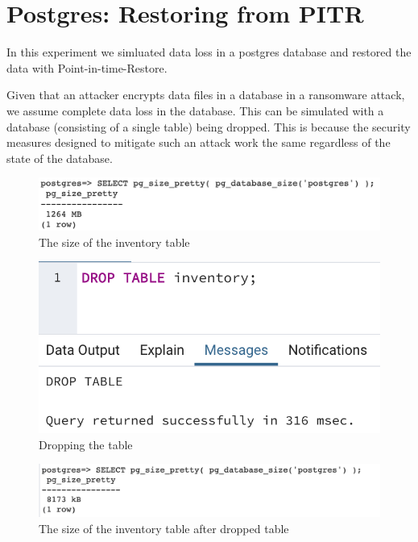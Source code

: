 \section{Postgres: Restoring from PITR}
\label{app_pg_s1e1}

In this experiment we simluated data loss in a postgres database and restored the data with Point-in-time-Restore. 

Given that an attacker encrypts data files in a database in a ransomware attack, we assume complete data loss in the database. This can be simulated with a database (consisting of a single table) being dropped. This is because the security measures designed to mitigate such an attack work the same regardless of the state of the database.

\begin{figure}[h]
    \centering
    \includegraphics[width=\textwidth]{figures/postgres/postgres-1GB.png}
    \caption{The size of the inventory table}
    \label{fig:my_label}
\end{figure}

\begin{figure}[h]
    \centering
    \includegraphics[scale=0.75]{figures/postgres/drop_table.png}
    \caption{Dropping the table}
    \label{fig:my_label}
\end{figure}

\begin{figure}[h]
    \centering
    \includegraphics[width=\textwidth]{figures/postgres/postgres_size_post.png}
    \caption{The size of the inventory table after dropped table}
    \label{fig:my_label}
\end{figure}


